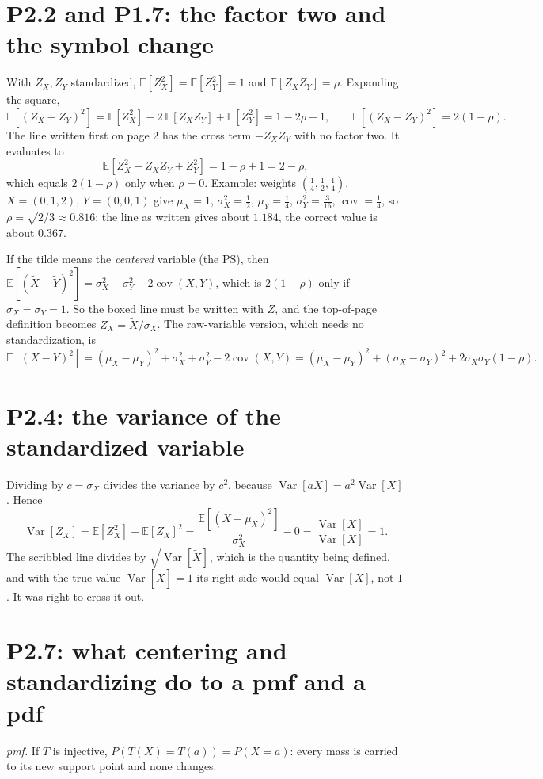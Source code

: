 \documentclass[11pt]{article}
\newcommand{\E}{\mathbb{E}}
\newcommand{\Var}{\operatorname{Var}}
\newcommand{\Cov}{\operatorname{cov}}
\begin{document}
\section{P2.2 and P1.7: the factor two and the symbol change}

With $Z_X,Z_Y$ standardized, $\E[Z_X^2]=\E[Z_Y^2]=1$ and $\E[Z_XZ_Y]=\rho$. Expanding the square,
\[
\E[(Z_X-Z_Y)^2]=\E[Z_X^2]-2\,\E[Z_XZ_Y]+\E[Z_Y^2]=1-2\rho+1,
\qquad
\boxed{\E[(Z_X-Z_Y)^2]=2(1-\rho)}.
\]
The line written first on page 2 has the cross term $-Z_XZ_Y$ with no factor two. It evaluates to
\[
\E[Z_X^2-Z_XZ_Y+Z_Y^2]=1-\rho+1=2-\rho,
\]
which equals $2(1-\rho)$ only when $\rho=0$. Example: weights $(\tfrac14,\tfrac12,\tfrac14)$, $X=(0,1,2)$, $Y=(0,0,1)$ give $\mu_X=1$, $\sigma_X^2=\tfrac12$, $\mu_Y=\tfrac14$, $\sigma_Y^2=\tfrac3{16}$, $\Cov=\tfrac14$, so $\rho=\sqrt{2/3}\approx0.816$; the line as written gives about $1.184$, the correct value is about $0.367$.

If the tilde means the \emph{centered} variable (the PS), then $\E[(\tilde X-\tilde Y)^2]=\sigma_X^2+\sigma_Y^2-2\Cov(X,Y)$, which is $2(1-\rho)$ only if $\sigma_X=\sigma_Y=1$. So the boxed line must be written with $Z$, and the top-of-page definition becomes $Z_X=\tilde X/\sigma_X$. The raw-variable version, which needs no standardization, is
\[
\E[(X-Y)^2]=(\mu_X-\mu_Y)^2+\sigma_X^2+\sigma_Y^2-2\Cov(X,Y)
=(\mu_X-\mu_Y)^2+(\sigma_X-\sigma_Y)^2+2\sigma_X\sigma_Y(1-\rho).
\]

\section{P2.4: the variance of the standardized variable}

Dividing by $c=\sigma_X$ divides the variance by $c^2$, because $\Var[aX]=a^2\Var[X]$. Hence
\[
\Var[Z_X]=\E[Z_X^2]-\E[Z_X]^2=\frac{\E[(X-\mu_X)^2]}{\sigma_X^2}-0=\frac{\Var[X]}{\Var[X]}=1 .
\]
The scribbled line divides by $\sqrt{\Var[\tilde X]}$, which is the quantity being defined, and with the true value $\Var[\tilde X]=1$ its right side would equal $\Var[X]$, not $1$. It was right to cross it out.

\section{P2.7: what centering and standardizing do to a pmf and a pdf}

\emph{pmf.} If $T$ is injective, $P(T(X)=T(a))=P(X=a)$: every mass is carried to its new support point and none changes.
\end{document}
